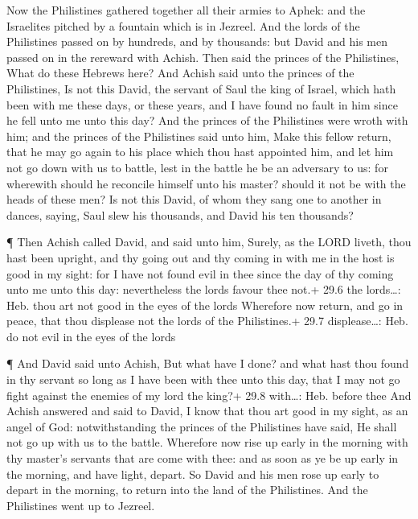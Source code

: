  Now the Philistines gathered together all their armies to
Aphek: and the Israelites pitched by a fountain which is in Jezreel.
 And the lords of the Philistines passed on by hundreds, and
by thousands: but David and his men passed on in the rereward with
Achish.  Then said the princes of the Philistines, What do
these Hebrews here? And Achish said unto the princes of the Philistines,
Is not this David, the servant of Saul the king of Israel, which hath
been with me these days, or these years, and I have found no fault in
him since he fell unto me unto this day?  And the princes of
the Philistines were wroth with him; and the princes of the Philistines
said unto him, Make this fellow return, that he may go again to his
place which thou hast appointed him, and let him not go down with us to
battle, lest in the battle he be an adversary to us: for wherewith
should he reconcile himself unto his master? should it not be with the
heads of these men?  Is not this David, of whom they sang
one to another in dances, saying, Saul slew his thousands, and David his
ten thousands?

 ¶ Then Achish called David, and said unto him, Surely, as
the LORD liveth, thou hast been upright, and thy going out and thy
coming in with me in the host is good in my sight: for I have not found
evil in thee since the day of thy coming unto me unto this day:
nevertheless the lords favour thee not.+ 29.6 the lords\ldots: Heb. thou
art not good in the eyes of the lords  Wherefore now return,
and go in peace, that thou displease not the lords of the Philistines.+
29.7 displease\ldots: Heb. do not evil in the eyes of the lords

 ¶ And David said unto Achish, But what have I done? and
what hast thou found in thy servant so long as I have been with thee
unto this day, that I may not go fight against the enemies of my lord
the king?+ 29.8 with\ldots: Heb. before thee  And Achish
answered and said to David, I know that thou art good in my sight, as an
angel of God: notwithstanding the princes of the Philistines have said,
He shall not go up with us to the battle.  Wherefore now
rise up early in the morning with thy master's servants that are come
with thee: and as soon as ye be up early in the morning, and have light,
depart.  So David and his men rose up early to depart in
the morning, to return into the land of the Philistines. And the
Philistines went up to Jezreel.

